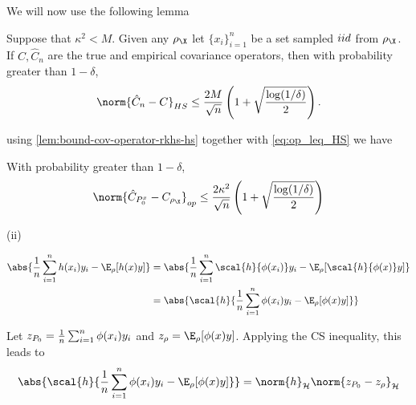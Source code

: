 We will now use the following lemma
\begin{lemma}
  \label{lem:bound-cov-operator-rkhs-hs}
  Suppose that \(\kappa^{2} < M\). Given any \(\rho_{\X}\) let \(\{x_{i}\}_{i=1}^{n}\) be a set sampled \(iid\) from \(\rho_{\X}\). If \(C,
  \hat{C}_{n}\) are the true and empirical covariance operators, then with
  probability greater than \(1 - \delta\),
  \begin{equation}
    \label{eq:bound-cov-operator-rkhs-hs}
    \norm{\hat{C}_{n} - C}_{HS} \leq \frac{2M}{\sqrt{n}}\left( 1 + \sqrt{\frac{\log(1/\delta)}{2}} \right).
  \end{equation}
\end{lemma}
using \ref{lem:bound-cov-operator-rkhs-hs} together with \ref{eq:op_leq_HS} we have
\begin{corollary}
  \label{cor:bound-cov-op-diff-in-prob}
  With probability greater than \(1 - \delta\),
  \begin{equation}
    \label{eq:bound-cov-op-diff-in-prob}
    \norm{\hat{C}_{\poolsetx_{0}} - C_{\rho_{\X}}}_{op} \leq \frac{2\kappa^{2}}{\sqrt{n}}\left( 1 + \sqrt{\frac{\log(1/\delta)}{2}} \right)
  \end{equation}
\end{corollary}

\begin{description}
\item[{(ii)}] 
\end{description}
\begin{align*}
  \abs{\frac{1}{n} \sum_{i=1}^n h(x_i)y_i - \E_{\rho}[h(x)y]} & = \abs{\frac{1}{n} \sum_{i=1}^n \scal{ h}{ \phi(x_i) } y_i - \E_{\rho}[\scal{ h}{ \phi(x) } y]} \\
                                                              & = \abs{\scal{ h}{ \frac{1}{n} \sum_{i=1}^n \phi(x_i) y_i - \E_{\rho}[\phi(x) y] }}
\end{align*}

Let \(z_{P_{0}} = \frac{1}{n} \sum_{i=1}^n \phi(x_i) y_i\) and
\(z_{\rho} = \E_{\rho}[\phi(x) y]\). Applying the CS inequality, this leads to
\begin{equation*}
  \abs{\scal{h}{\frac{1}{n} \sum_{i=1}^n \phi(x_i) y_i - \E_{\rho}[\phi(x) y] }} = \norm{h}_{\rkhs{H}}\norm{z_{\poolset_0} - z_{\rho}}_{\rkhs{H}}
\end{equation*}

